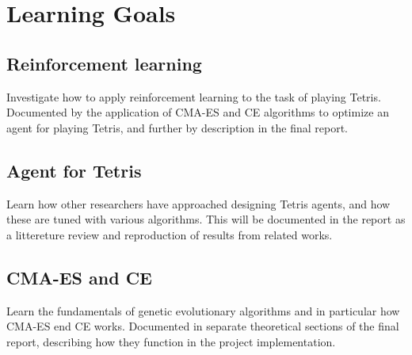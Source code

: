\section*{Learning Goals}
\subsection*{Reinforcement learning}
Investigate how to apply reinforcement learning to the task of playing Tetris. Documented by the application of CMA-ES and CE algorithms to optimize an agent for playing Tetris, and further by description in the final report.

\subsection*{Agent for Tetris}
Learn how other researchers have approached designing Tetris agents, and
how these are tuned with various algorithms. This will be documented in the 
report as a littereture review and reproduction of results from related works.

\subsection*{CMA-ES and CE}
Learn the fundamentals of genetic evolutionary algorithms
and in particular how CMA-ES end CE works. 
Documented in separate theoretical sections of the final report, 
describing how they function in the project implementation.